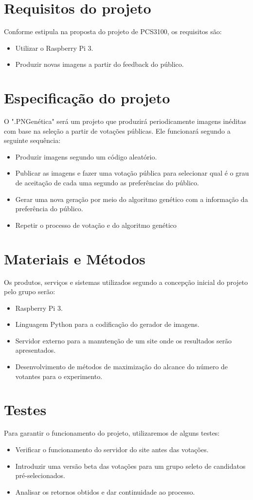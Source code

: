 \documentclass{article}
\begin{document}
	\section{Requisitos do projeto}
	Conforme estipula na proposta do projeto de PCS3100, os requisitos são:
	\begin{itemize}
		\item Utilizar o Raspberry Pi 3.
		\item Produzir novas imagens a partir do feedback do público.
	\end{itemize}
	
	\section{Especificação do projeto}
	O ".PNGenética" será um projeto que produzirá periodicamente imagens inéditas com base na seleção a partir de votações públicas. Ele funcionará segundo a seguinte sequência:
	\begin{itemize}
	\item Produzir imagens segundo um código aleatório.
	\item Publicar as imagens e fazer uma votação pública para selecionar qual é o grau de aceitação de cada uma segundo as preferências do público.
	\item Gerar uma nova geração por meio do algoritmo genético com a informação da preferência do público. 
	\item Repetir o processo de votação e do algoritmo genético
	\end{itemize}

	\section{Materiais e Métodos}
	Os produtos, serviços e sistemas utilizados segundo a concepção inicial do projeto pelo grupo serão: 
	\begin{itemize}
		\item Raspberry Pi 3.
		\item Linguagem Python para a codificação do gerador de imagens.
		\item Servidor externo para a manutenção de um site onde os resultados serão apresentados.
		\item Desenvolvimento de métodos de maximização do alcance do número de votantes para o experimento.
	\end{itemize}

	\section{Testes}	
	Para garantir o funcionamento do projeto, utilizaremos de alguns testes:
	\begin{itemize}
		\item Verificar o funcionamento do servidor do site antes das votações.
		\item Introduzir uma versão beta das votações para um grupo seleto de candidatos pré-selecionados.
		\item Analisar os retornos obtidos e dar continuidade ao processo.
	\end{itemize}
	
\end{document}
